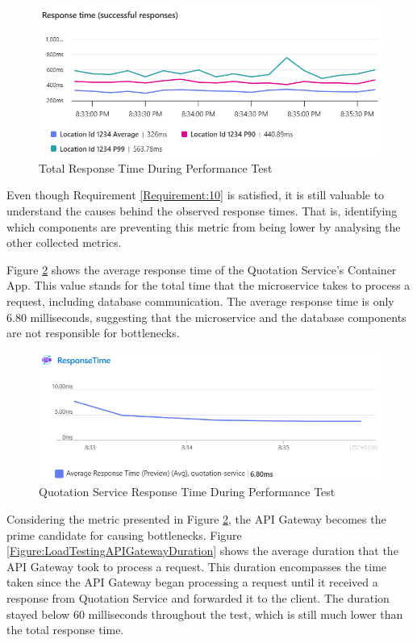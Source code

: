 \documentclass[12pt, reqno]{amsbook}
\theoremstyle{definition}
\theoremstyle{definition}
\numberwithin{section}{chapter}
\numberwithin{table}{chapter}
\numberwithin{figure}{chapter}
\begin{document}
\begin{figure}[H]
  \centering
  \includegraphics[width=1\linewidth]{images/LoadTestingTotalResponseTime.png}
  \caption{\label{Figure:LoadTestingTotalResponseTime}Total Response Time During Performance Test}
\end{figure}

Even though Requirement \ref{Requirement:10} is satisfied, it is still valuable to understand the causes behind the observed response times. That is, identifying which components are preventing this metric from being lower by analysing the other collected metrics.

Figure \ref{Figure:LoadTestingMicroserviceResponseTime} shows the average response time of the Quotation Service's Container App. This value stands for the total time that the microservice takes to process a request, including database communication. The average response time is only 6.80 milliseconds, suggesting that the microservice and the database components are not responsible for bottlenecks.

\begin{figure}[H]
  \centering
  \includegraphics[width=1\linewidth]{images/LoadTestingMicroserviceResponseTime.png}
  \caption{\label{Figure:LoadTestingMicroserviceResponseTime}Quotation Service Response Time During Performance Test}
\end{figure}

Considering the metric presented in Figure \ref{Figure:LoadTestingMicroserviceResponseTime}, the \ac{API} Gateway becomes the prime candidate for causing bottlenecks. Figure \ref{Figure:LoadTestingAPIGatewayDuration} shows the average duration that the \ac{API} Gateway took to process a request. This duration encompasses the time taken since the \ac{API} Gateway began processing a request until it received a response from Quotation Service and forwarded it to the client. The duration stayed below 60 milliseconds throughout the test, which is still much lower than the total response time.
\end{document}
